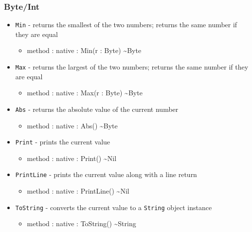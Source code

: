 \documentclass[12pt]{article}
\begin{document}
\subsubsection{Byte/Int}
\begin{itemize}
\item \texttt{Min} - returns the smallest of the two numbers; returns
  the same number if they are equal
  \begin{itemize}
  \item method : native : Min(r : Byte) \textasciitilde Byte
  \end{itemize}
\item \texttt{Max} - returns the largest of the two numbers; returns
  the same number if they are equal
  \begin{itemize}
  \item method : native : Max(r : Byte) \textasciitilde Byte
  \end{itemize}
\item \texttt{Abs} - returns the absolute value of the current number
  \begin{itemize}
  \item method : native : Abs() \textasciitilde Byte
  \end{itemize}
\item \texttt{Print} - prints the current value
  \begin{itemize}
  \item method : native : Print() \textasciitilde Nil
  \end{itemize}
\item \texttt{PrintLine} - prints the current value along with a line
  return
  \begin{itemize}
  \item method : native : PrintLine() \textasciitilde Nil
  \end{itemize}
\item \texttt{ToString} - converts the current value to a
  \texttt{String} object instance
  \begin{itemize}
  \item method : native : ToString() \textasciitilde String
  \end{itemize}
\end{itemize}
\end{document}
